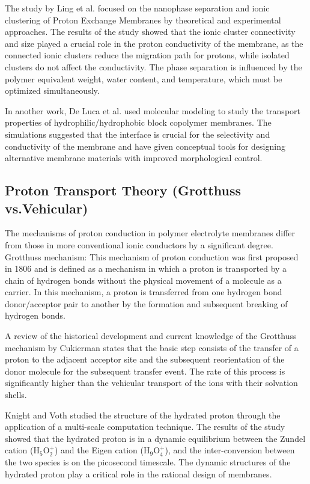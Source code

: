 \documentclass[12pt,a4paper]{report}
\begin{document}
The study by Ling et al. focused on the nanophase separation and ionic clustering of Proton Exchange Membranes by theoretical and experimental approaches.\cite{25} The results of the study showed that the ionic cluster connectivity and size played a crucial role in the proton conductivity of the membrane, as the connected ionic clusters reduce the migration path for protons, while isolated clusters do not affect the conductivity. The phase separation is influenced by the polymer equivalent weight, water content, and temperature, which must be optimized simultaneously.

In another work, De Luca et al. used molecular modeling to study the transport properties of hydrophilic/hydrophobic block copolymer membranes.\cite{26} The simulations suggested that the interface is crucial for the selectivity and conductivity of the membrane and have given conceptual tools for designing alternative membrane materials with improved morphological control.



\subsection{Proton Transport Theory (Grotthuss vs.Vehicular)}
The mechanisms of proton conduction in polymer electrolyte membranes differ from those in more conventional ionic conductors by a significant degree. Grotthuss mechanism: This mechanism of proton conduction was first proposed in 1806 and is defined as a mechanism in which a proton is transported by a chain of hydrogen bonds without the physical movement of a molecule as a carrier.\cite{16} In this mechanism, a proton is transferred from one hydrogen bond donor/acceptor pair to another by the formation and subsequent breaking of hydrogen bonds.

A review of the historical development and current knowledge of the Grotthuss mechanism by Cukierman states that the basic step consists of the transfer of a proton to the adjacent acceptor site and the subsequent reorientation of the donor molecule for the subsequent transfer event.\cite{27} The rate of this process is significantly higher than the vehicular transport of the ions with their solvation shells.

Knight and Voth studied the structure of the hydrated proton through the application of a multi-scale computation technique.\cite{28} The results of the study showed that the hydrated proton is in a dynamic equilibrium between the Zundel cation (H\(_5\)O\(_2^+\)) and the Eigen cation (H\(_9\)O\(_4^+\)), and the inter-conversion between the two species is on the picosecond timescale. The dynamic structures of the hydrated proton play a critical role in the rational design of membranes.
\end{document}
